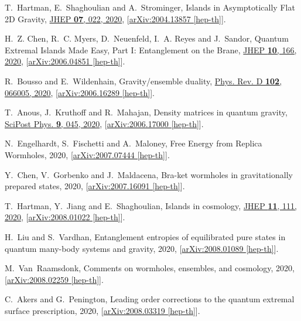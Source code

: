 \documentclass[12pt]{article}
\numberwithin{equation}{section}
\begin{document}
\begin{thebibliography}{10}
T.~Hartman, E.~Shaghoulian and A.~Strominger, {{Islands in Asymptotically Flat
  2D Gravity}}, \href{http://dx.doi.org/10.1007/JHEP07(2020)022}{JHEP {\bf 07},
  022, 2020}, [\href{http://arxiv.org/abs/arXiv:2004.13857}{{arXiv:2004.13857
  [hep-th]}}].

H.~Z. Chen, R.~C. Myers, D.~Neuenfeld, I.~A. Reyes and J.~Sandor, {{Quantum
  Extremal Islands Made Easy, Part I: Entanglement on the Brane}},
  \href{http://dx.doi.org/10.1007/JHEP10(2020)166}{JHEP {\bf 10}, 166, 2020},
  [\href{http://arxiv.org/abs/arXiv:2006.04851}{{arXiv:2006.04851 [hep-th]}}].

R.~Bousso and E.~Wildenhain, {{Gravity/ensemble duality}},
  \href{http://dx.doi.org/10.1103/PhysRevD.102.066005}{Phys. Rev. D {\bf 102},
  066005, 2020},
  [\href{http://arxiv.org/abs/arXiv:2006.16289}{{arXiv:2006.16289 [hep-th]}}].

T.~Anous, J.~Kruthoff and R.~Mahajan, {{Density matrices in quantum gravity}},
  \href{http://dx.doi.org/10.21468/SciPostPhys.9.4.045}{SciPost Phys. {\bf 9},
  045, 2020}, [\href{http://arxiv.org/abs/arXiv:2006.17000}{{arXiv:2006.17000
  [hep-th]}}].

N.~Engelhardt, S.~Fischetti and A.~Maloney, {{Free Energy from Replica
  Wormholes}},  2020,
  [\href{http://arxiv.org/abs/arXiv:2007.07444}{{arXiv:2007.07444 [hep-th]}}].

Y.~Chen, V.~Gorbenko and J.~Maldacena, {{Bra-ket wormholes in gravitationally
  prepared states}},  2020,
  [\href{http://arxiv.org/abs/arXiv:2007.16091}{{arXiv:2007.16091 [hep-th]}}].

T.~Hartman, Y.~Jiang and E.~Shaghoulian, {{Islands in cosmology}},
  \href{http://dx.doi.org/10.1007/JHEP11(2020)111}{JHEP {\bf 11}, 111, 2020},
  [\href{http://arxiv.org/abs/arXiv:2008.01022}{{arXiv:2008.01022 [hep-th]}}].

H.~Liu and S.~Vardhan, {{Entanglement entropies of equilibrated pure states in
  quantum many-body systems and gravity}},  2020,
  [\href{http://arxiv.org/abs/arXiv:2008.01089}{{arXiv:2008.01089 [hep-th]}}].

M.~Van~Raamsdonk, {{Comments on wormholes, ensembles, and cosmology}},  2020,
  [\href{http://arxiv.org/abs/arXiv:2008.02259}{{arXiv:2008.02259 [hep-th]}}].

C.~Akers and G.~Penington, {{Leading order corrections to the quantum extremal
  surface prescription}},  2020,
  [\href{http://arxiv.org/abs/arXiv:2008.03319}{{arXiv:2008.03319 [hep-th]}}].


\end{thebibliography}
\end{document}
